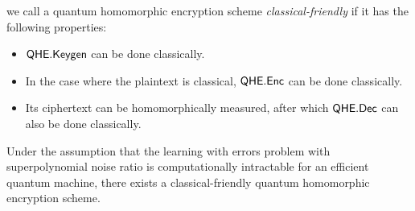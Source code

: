 \begin{definition}
	we call a quantum homomorphic encryption scheme \emph{classical-friendly} if it has the following properties:
	\begin{itemize}
		\item $\mathsf{QHE.Keygen}$ can be done classically.
		\item In the case where the plaintext is classical, $\mathsf{QHE.Enc}$ can be done classically.
		\item Its ciphertext can be homomorphically measured, after which $\mathsf{QHE.Dec}$ can also be done classically.
	\end{itemize}
\end{definition}

\begin{theorem} 
	Under the assumption that the learning with errors problem with superpolynomial noise ratio is computationally intractable for an efficient quantum machine,
	there exists a classical-friendly quantum homomorphic encryption scheme.
\end{theorem}
